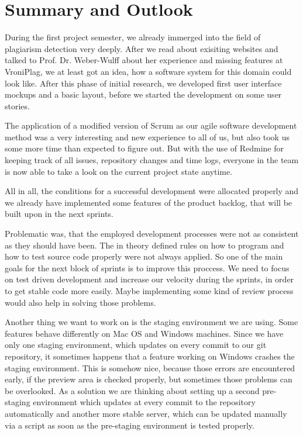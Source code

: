 \chapter{Summary and Outlook}\label{chap:summaryAndOutlook}

During the first project semester, we already immerged into the field of plagiarism detection very deeply. After
we read about exisiting websites and talked to Prof. Dr. Weber-Wulff about her experience and missing features
at VroniPlag, we at least got an idea, how a software system for this domain could look like. After this phase of 
initial research, we 
developed first 
user interface mockups and
a basic layout, before we started the development on some user stories. 

The application of a modified version of Scrum as our agile software development method was a very interesting and new
experience to all of us, but also took us some more time than expected to figure out. But with the use of Redmine for 
keeping track of all 
issues, repository changes and time logs, 
everyone in the team is now able to take a look on the current project state anytime.

All in all, the conditions for a successful development were allocated properly and we already have implemented some 
features of the product backlog, that will be built upon in the next sprints.

Problematic was, that the employed development processes were not as consistent as they should have been. The in 
theory defined rules on how to program and how to test source code properly were not always applied. So one of the 
main goals for the next block of sprints is to improve this proccess. We need to focus on test driven development and 
increase our velocity during the sprints, in order to get stable code more easily. Maybe implementing some kind of 
review process would also help in solving those problems.

Another thing we want to work on is the staging environment we are using. Some features behave differently on Mac 
OS and Windows machines. Since we have only one staging environment, which updates on every commit to our git 
repository, it sometimes happens that a feature working on Windows crashes the staging environment. This is somehow 
nice, because those errors are encountered early, if the preview area is checked properly, but sometimes those problems
can be overlooked. As a solution 
we are thinking about setting up a second pre-staging environment which updates at every commit to the repository 
automatically and 
another more stable server, which can be updated manually via a script as soon as the pre-staging environment is tested properly. 


